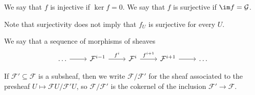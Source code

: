 We say that $f$ is injective if $\ker f = 0$. We say that $f$ is surjective if $\im f = \mathcal{G}$.

Note that surjectivity does not imply that $f_U$ is surjective for every $U$.

We say that a sequence of morphisms of sheaves
\[\begin{tikzcd}
	\ldots \arrow[r] & \mathcal{F}^{i-1} \arrow[r, "f^i"] & \mathcal{F}^i \arrow[r, "f^{i+1}"] & \mathcal{F}^{i+1} \arrow[r] & \ldots
\end{tikzcd}\]

If $\mathcal{F}' \subseteq \mathcal{F}$ is a subsheaf, then we write $\mathcal{F}/\mathcal{F}'$ for the
sheaf associated to the presheaf $U\mapsto \mathcal{F}U/\mathcal{F}'U$, so $\mathcal{F}/\mathcal{F}'$ is
the cokernel of the inclusion $\mathcal{F}' \to \mathcal{F}$.
